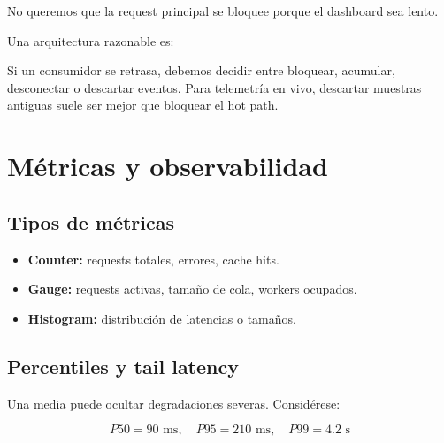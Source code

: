 \documentclass[11pt,a4paper]{article}
\begin{document}
No queremos que la request principal se bloquee porque el dashboard sea lento.

Una arquitectura razonable es:

\begin{center}
\end{center}

Si un consumidor se retrasa, debemos decidir entre bloquear, acumular, desconectar o descartar eventos. Para telemetría en vivo, descartar muestras antiguas suele ser mejor que bloquear el hot path.

\section{Métricas y observabilidad}

\subsection{Tipos de métricas}

\begin{itemize}
  \item \textbf{Counter:} requests totales, errores, cache hits.
  \item \textbf{Gauge:} requests activas, tamaño de cola, workers ocupados.
  \item \textbf{Histogram:} distribución de latencias o tamaños.
\end{itemize}

\subsection{Percentiles y tail latency}

Una media puede ocultar degradaciones severas. Considérese:

\[
P50 = 90\text{ ms},\quad P95 = 210\text{ ms},\quad P99 = 4.2\text{ s}
\]
\end{document}
